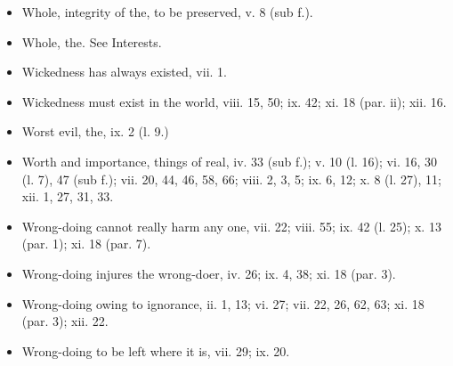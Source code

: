 \begin{itemize}[leftmargin=*]
\setlength\itemsep{0em}
\item
  Whole, integrity of the, to be preserved, v. 8 (sub f.).
\item
  Whole, the. See Interests.
\item
  Wickedness has always existed, vii. 1.
\item
  Wickedness must exist in the world, viii. 15, 50; ix. 42; xi. 18 (par.
  ii); xii. 16.
\item
  Worst evil, the, ix. 2 (l. 9.)
\item
  Worth and importance, things of real, iv. 33 (sub f.); v. 10 (l. 16);
  vi. 16, 30 (l. 7), 47 (sub f.); vii. 20, 44, 46, 58, 66; viii. 2, 3,
  5; ix. 6, 12; x. 8 (l. 27), 11; xii. 1, 27, 31, 33.
\item
  Wrong-doing cannot really harm any one, vii. 22; viii. 55; ix. 42 (l.
  25); x. 13 (par. 1); xi. 18 (par. 7).
\item
  Wrong-doing injures the wrong-doer, iv. 26; ix. 4, 38; xi. 18 (par.
  3).
\item
  Wrong-doing owing to ignorance, ii. 1, 13; vi. 27; vii. 22, 26, 62,
  63; xi. 18 (par. 3); xii. 22.
\item
  Wrong-doing to be left where it is, vii. 29; ix. 20.
\end{itemize}